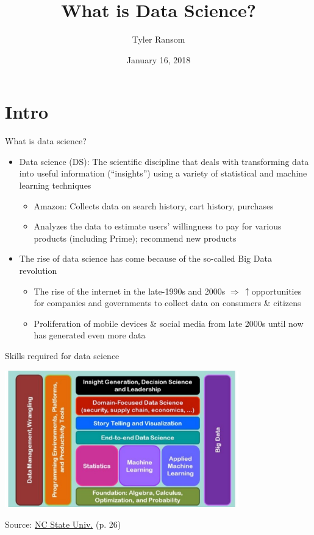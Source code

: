 \documentclass[english,aspectratio=169,12pt,xcolor=dvipsnames]{beamer}
\title{What is Data Science?}
\author{Tyler Ransom}
\institute[OU Econ]{\normalsize{University of Oklahoma, Dept. of Economics}}
\date{January 16, 2018}
\begin{document}
{
\frame[noframenumbering]{\titlepage}
}


\section{Intro}
\begin{frame}{What is data science?}
\begin{itemize}
\item \alert{Data science (DS):} The scientific discipline that deals with transforming data into useful information (``insights'') using a variety of statistical and machine learning techniques
    \begin{itemize}
    \item \alert{Amazon:} Collects data on search history, cart history, purchases
    \item Analyzes the data to estimate users' willingness to pay for various products (including Prime); recommend new products
    \end{itemize}
\item The rise of data science has come because of the so-called Big Data revolution
    \begin{itemize}
    \item The rise of the internet in the late-1990s and 2000s $\Rightarrow \,\uparrow$opportunities for companies and governments to collect data on consumers \& citizens
    \item Proliferation of mobile devices \& social media from late 2000s until now has generated even more data
    \end{itemize}
\end{itemize}
\end{frame}


\begin{frame}{Skills required for data science}
\begin{center}
\includegraphics[width=0.76\textwidth]{../Graphics/NASEMdatasci.eps}
\end{center}
{\scriptsize Source: \href{http://sites.nationalacademies.org/cs/groups/cstbsite/documents/webpage/cstb_181680.pdf}{NC State Univ.} (p. 26)}
\end{frame}
\end{document}
